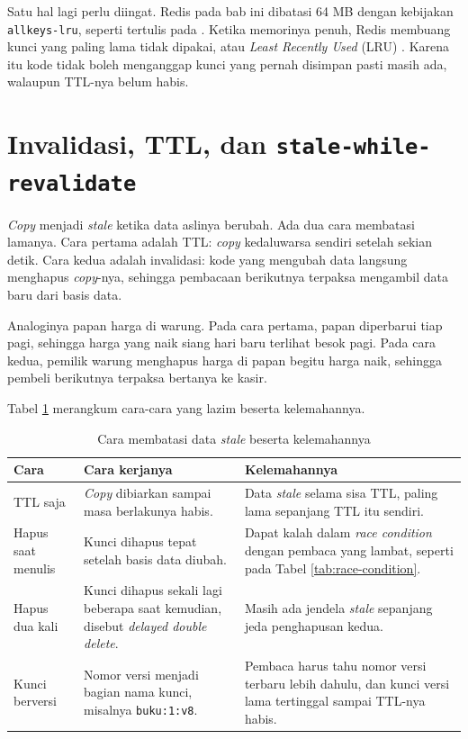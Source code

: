 Satu hal lagi perlu diingat. Redis pada bab ini dibatasi 64 MB dengan kebijakan
\texttt{allkeys-lru}, seperti tertulis pada
. Ketika memorinya penuh, Redis
membuang kunci yang paling lama tidak dipakai, atau
\textit{Least Recently Used} (LRU)
\cite{redis-eviction}. Karena itu kode tidak boleh menganggap kunci yang pernah
disimpan pasti masih ada, walaupun TTL-nya belum habis.

\section{Invalidasi, TTL, dan \texttt{stale-while-revalidate}}
\label{sec:invalidasi}

\textit{Copy} menjadi \textit{stale} ketika data aslinya berubah. Ada dua cara membatasi
lamanya. Cara pertama adalah TTL: \textit{copy} kedaluwarsa sendiri setelah sekian
detik. Cara kedua adalah invalidasi: kode yang mengubah data langsung menghapus
\textit{copy}-nya, sehingga pembacaan berikutnya terpaksa mengambil data baru dari
basis data.

Analoginya papan harga di warung. Pada cara pertama, papan diperbarui tiap
pagi, sehingga harga yang naik siang hari baru terlihat besok pagi. Pada cara
kedua, pemilik warung menghapus harga di papan begitu harga naik, sehingga
pembeli berikutnya terpaksa bertanya ke kasir.

Tabel \ref{tab:cara-invalidasi} merangkum cara-cara yang lazim beserta
kelemahannya.

\begin{table}[!htb]
  \centering
  \caption{Cara membatasi data \textit{stale} beserta kelemahannya}
  \label{tab:cara-invalidasi}
  \begin{tabularx}{\textwidth}{lXX}
    \hline
    \textbf{Cara} & \textbf{Cara kerjanya} & \textbf{Kelemahannya} \\
    \hline
    TTL saja & \textit{Copy} dibiarkan sampai masa berlakunya habis. & Data \textit{stale} selama sisa TTL, paling lama sepanjang TTL itu sendiri. \\
    \hline
    Hapus saat menulis & Kunci dihapus tepat setelah basis data diubah. & Dapat kalah dalam \textit{race condition} dengan pembaca yang lambat, seperti pada Tabel \ref{tab:race-condition}. \\
    \hline
    Hapus dua kali & Kunci dihapus sekali lagi beberapa saat kemudian, disebut \textit{delayed double delete}. & Masih ada jendela \textit{stale} sepanjang jeda penghapusan kedua. \\
    \hline
    Kunci berversi & Nomor versi menjadi bagian nama kunci, misalnya \texttt{buku:1:v8}. & Pembaca harus tahu nomor versi terbaru lebih dahulu, dan kunci versi lama tertinggal sampai TTL-nya habis. \\
    \hline
  \end{tabularx}
\end{table}

